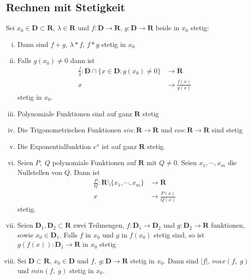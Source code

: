 \documentclass[8pt]{extarticle}
\begin{document}
\begin{multicols*}{3}

\subsection{Rechnen mit Stetigkeit}

Sei $x_0 \in \mathbf{D} \subset \mathbf{R}$, $\lambda \in \mathbf{R}$ und $f: \mathbf{D} \rightarrow \mathbf{R}$,
$g: \mathbf{D} \rightarrow \mathbf{R}$ beide in $x_0$ stetig:
\begin{enumerate}[(i)]
  \item Dann sind $f + g$, $\lambda * f$, $f * g$ stetig in $x_0$
  \item Falls $g(x_0) \neq 0$ dann ist
  \begin{align*}
    \frac{f}{g}: \mathbf{D} \cap \{x \in \mathbf{D}: g(x_0) \neq 0\} &\rightarrow \mathbf{R}\\
    x &\rightarrow \frac{f(x)}{g(x)}
  \end{align*}
  stetig in $x_0$.
  \item Polynomiale Funktionen sind auf ganz $\mathbf{R}$ stetig
  \item Die Trigonometrischen Funktionen $sin: \mathbf{R} \rightarrow \mathbf{R}$ und $cos: \mathbf{R} \rightarrow \mathbf{R}$ sind stetig
  \item Die Exponentialfunktion $e^x$ ist auf ganz $\mathbf{R}$ stetig.
  \item Seien $P, \;Q$ polynomiale Funktionen auf $\mathbf{R}$ mit $Q \neq 0$.
  Seien $x_1, \cdots, x_m$ die Nullstellen von $Q$. Dann ist
  \begin{align*}
    \frac{P}{Q} : \mathbf{R} \setminus \{x_1, \cdots, x_m\} &\rightarrow \mathbf{R}\\
    x &\rightarrow \frac{P(x)}{Q(x)}
  \end{align*}
  stetig.
  \item Seien $\mathbf{D}_1, \mathbf{D}_2 \subset \mathbf{R}$ zwei Teilmengen,
  $f:\mathbf{D}_1 \rightarrow \mathbf{D}_2$ und $g:\mathbf{D}_2 \rightarrow \mathbf{R}$
  funktionen, sowie $x_0 \in \mathbf{D}_1$. Falls $f$ in $x_0$ und $g$ in $f(x_0)$ stetig
  sind, so ist $g(f(x)): \mathbf{D}_1 \rightarrow \mathbf{R}$ in $x_0$ stetig
  \item Sei $\mathbf{D} \subset \mathbf{R}$, $x_0 \in \mathbf{D}$ und $f,\;g: \mathbf{D} \rightarrow \mathbf{R}$
  stetig in $x_0$. Dann sind $|f|$, $max(f,\;g)$ und $min(f, \; g)$ stetig in $x_0$.
\end{enumerate}


\end{multicols*}
\end{document}
